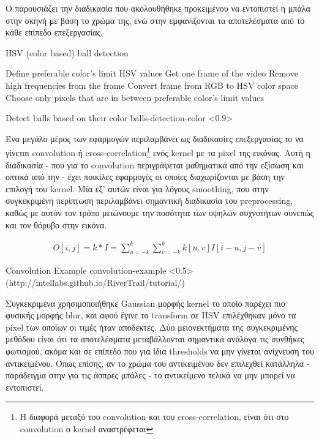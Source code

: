 Ο  παρουσιάζει την διαδικασία που ακολουθήθηκε προκειμένου να ε\-ντο\-πι\-στεί η μπάλα στην σκηνή με βάση το χρώμα της, ενώ στην  εμφανίζονται τα αποτελέσματα από το κάθε επίπεδο επεξεργασίας.

\begin{algorithm}[H]
	\caption[HSV (color based) ball detection]{HSV (color based) ball detection}\label{alg:hsv-detect}
	\begin{algorithmic}[1]
            \State Define preferable color's limit HSV values
            \State Get one frame of the video
            \State Remove high frequencies from the frame
            \State Convert frame from RGB to HSV color space
            \State Choose only pixels that are in between preferable color's limit values 
	\end{algorithmic}
\end{algorithm}

%
{Detect balls based on their color}%
{balls-detection-color}%
<0.9>

Ένα μεγάλο μέρος των  εφαρμογών περιλαμβάνει ως διαδικασίες επεξεργασίας το να γίνεται convolution ή cross-correlation\footnote{Η διαφορά μεταξύ του convolution και του cross-correlation, είναι ότι στο convolution ο kernel αναστρέφεται} ενός kernel με τα pixel της εικόνας. Αυτή η διαδικασία - που για το convolution περιγράφεται μαθηματικά από την εξίσωση  και οπτικά από την  - έχει ποικίλες εφαρμογές οι οποίες διαχωρίζονται με βάση την επιλογή του kernel. Μία εξ' αυτών είναι για λόγους smoothing, που στην συγκεκριμένη περίπτωση περιλαμβάνει σημαντική διαδικασία του preprocessing, καθώς με αυτόν τον τρόπο μειώνουμε την ποσότητα των υψηλών συχνοτήτων συνεπώς και τον θόρυβο στην εικόνα.

\begin{gather}
	O[i,j] = k * I = \sum_{u=-k}^{k} \sum_{v=-k}^{k} k[u,v]I[i-u,j-v] \label{eq:cross-correlation}
\end{gather}

%
{Convolution Example}%
{convolution-example}%
<0.5>%
(http://intellabs.github.io/RiverTrail/tutorial/)

Συγκεκριμένα χρησιμοποιήθηκε Gaussian μορφής kernel το οποίο παρέχει πιο φυσικής μορφής blur, και αφού έγινε το transform σε HSV επιλέχθηκαν μόνο τα pixel των οποίων οι τιμές ήταν αποδεκτές. Δύο μειονεκτήματα της συγκεκριμένης μεθόδου είναι ότι τα αποτελέσματα μεταβάλλονται σημαντικά ανάλογα τις συνθήκες φωτισμού, ακόμα και σε επίπεδο που για ίδια thresholds να μην γίνεται ανίχνευση του αντικειμένου. Όπως επίσης, αν το χρώμα του αντικειμένου δεν επιλεχθεί κατάλληλα - παράδειγμα στην  για τις άσπρες μπάλες - το αντικείμενο τελικά να μην μπορεί να εντοπιστεί. 


